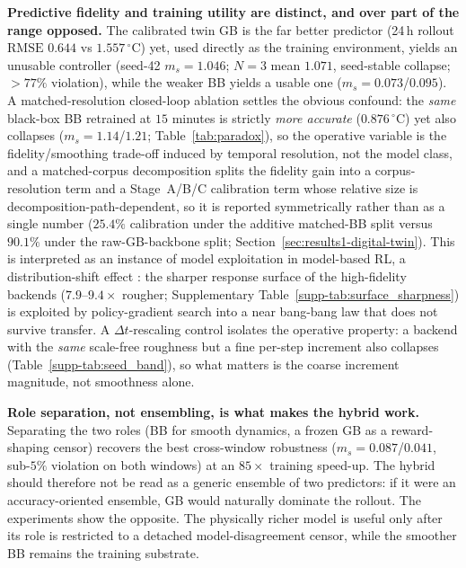 \documentclass[a4paper,fleqn]{cas-sc}
\newcommand{\RMSE}{\ensuremath{\mathrm{RMSE}}}
\newcommand{\suppref}[1]{\ref{supp-#1}}
\begin{document}
\textbf{Predictive fidelity and training utility are distinct, and over part of the range opposed.} The calibrated twin GB is the far better predictor (24\,h rollout \RMSE{} $0.644$ vs $1.557\,^{\circ}$C) yet, used directly as the training environment, yields an unusable controller (seed-42 $m_s=1.046$; $N=3$ mean $1.071$, seed-stable collapse; $>77\%$ violation), while the weaker BB yields a usable one ($m_s=0.073$/$0.095$). A matched-resolution closed-loop ablation settles the obvious confound: the \emph{same} black-box BB retrained at $15$ minutes is strictly \emph{more accurate} ($0.876\,^{\circ}$C) yet also collapses ($m_s=1.14$/$1.21$; Table~\ref{tab:paradox}), so the operative variable is the fidelity/smoothing trade-off induced by temporal resolution, not the model class, and a matched-corpus decomposition splits the fidelity gain into a corpus-resolution term and a Stage~A/B/C calibration term whose relative size is decomposition-path-dependent, so it is reported symmetrically rather than as a single number ($25.4\%$ calibration under the additive matched-BB split versus $90.1\%$ under the raw-GB-backbone split; Section~\ref{sec:results1-digital-twin}). This is interpreted as an instance of model exploitation in model-based RL, a distribution-shift effect \citep{Quinonero2009DatasetShift,RiahiSamani2026OOD}: the sharper response surface of the high-fidelity backends ($7.9$--$9.4\times$ rougher; Supplementary Table~\suppref{tab:surface_sharpness}) is exploited by policy-gradient search into a near bang-bang law that does not survive transfer. A $\Delta t$-rescaling control isolates the operative property: a backend with the \emph{same} scale-free roughness but a fine per-step increment also collapses (Table~\suppref{tab:seed_band}), so what matters is the coarse increment magnitude, not smoothness alone.

\textbf{Role separation, not ensembling, is what makes the hybrid work.} Separating the two roles (BB for smooth dynamics, a frozen GB as a reward-shaping censor) recovers the best cross-window robustness ($m_s=0.087$/$0.041$, sub-$5\%$ violation on both windows) at an $85\times$ training speed-up. The hybrid should therefore not be read as a generic ensemble of two predictors: if it were an accuracy-oriented ensemble, GB would naturally dominate the rollout. The experiments show the opposite. The physically richer model is useful only after its role is restricted to a detached model-disagreement censor, while the smoother BB remains the training substrate.
\end{document}
